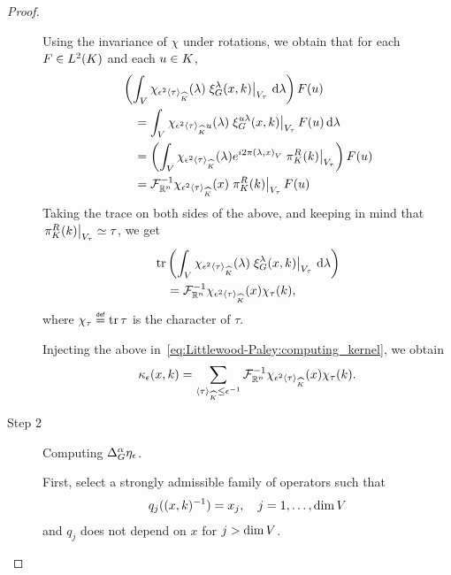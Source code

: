 \begin{proof}
\begin{description}
            Using the invariance of $\chi$ under rotations,
            we obtain that
            for each $F \in \Lebesgue 2 \CompactGroup$ and each $u \in \CompactGroup$,
            \begin{align*}
                &\left(\int_\VectorSpace \chi_{\epsilon^2 \JapaneseBracket \CompactGroup \tau} (\lambda) \eval {\Rep \lambda(x, k)} {V_\tau} \dd \lambda\right) F(u)\\
                &\quad = \int_\VectorSpace \chi_{\epsilon^2 \JapaneseBracket \CompactGroup \tau u} (\lambda) \eval {\Rep {u \lambda}(x, k)} {V_\tau} F(u) \dd \lambda\\
                &\quad = \left(\int_\VectorSpace \chi_{\epsilon^2 \JapaneseBracket \CompactGroup \tau} (\lambda) \e^{\i \turn \ip \lambda x} \eval {\RightRegularRepresentation(k)} {V_\tau}\right) F(u)\\
                &\quad = \InverseFourier [\R^n] \chi_{\epsilon^2 \JapaneseBracket \CompactGroup \tau}(x) \eval {\RightRegularRepresentation(k)} {V_\tau} F(u)
            \end{align*}
            Taking the trace on both sides of the above,
            and keeping in mind that $\eval {\RightRegularRepresentation(k)} {V_\tau} \simeq \tau$,
            we get
            \begin{align*}
                &\tr \left(\int_\VectorSpace \chi_{\epsilon^2 \JapaneseBracket \CompactGroup \tau} (\lambda) \eval {\Rep \lambda(x, k)} {V_\tau} \dd \lambda\right)\\
                &\quad = \InverseFourier [\R^n] \chi_{\epsilon^2 \JapaneseBracket \CompactGroup \tau}(x) \chi_\tau(k),
            \end{align*}
            where $\chi_\tau \defeq \tr \tau$ is the character of $\tau$.

            Injecting the above in~\eqref{eq:Littlewood-Paley:computing_kernel},
            we obtain
            \begin{align}
                \kappa_\epsilon(x, k)
                = \sum_{\JapaneseBracket \CompactGroup \tau \leq \epsilon^{-1}}
                \InverseFourier [\R^n] \chi_{\epsilon^2 \JapaneseBracket \CompactGroup \tau}(x) \chi_\tau(k).
                \label{eq:Littlewood-Paley:kernel}
            \end{align}
        \item [Step 2] Computing $\DifferenceOperatorOrder \alpha \eta_\epsilon$.

            First, select a strongly admissible family of operators such that
            \begin{align*}
                q_j((x, k)^{-1}) = x_j, \quad j = 1, \dots, \dim \VectorSpace
            \end{align*}
            and $q_j$ does not depend on $x$ for $j > \dim \VectorSpace$.


\end{description}
\end{proof}
